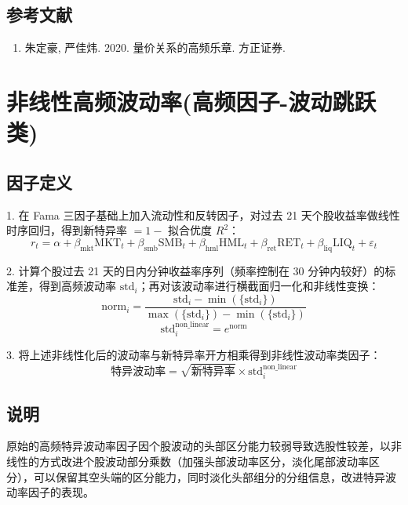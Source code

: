 \documentclass{article}
\begin{document}
\subsection{参考文献}
\begin{enumerate}
    \item 朱定豪, 严佳炜. 2020. 量价关系的高频乐章. 方正证券.
\end{enumerate}

\section{非线性高频波动率(高频因子-波动跳跃类)}

\subsection{因子定义}

1. 在 Fama 三因子基础上加入流动性和反转因子，对过去 21 天个股收益率做线性时序回归，得到新特异率 \( = 1 - \) 拟合优度 \( R^2 \)：
\begin{equation}
    r_t = \alpha + \beta_{\mathrm{mkt}} \mathrm{MKT}_t + \beta_{\mathrm{smb}} \mathrm{SMB}_t + \beta_{\mathrm{hml}} \mathrm{HML}_t + \beta_{\mathrm{ret}} \mathrm{RET}_t + \beta_{\mathrm{liq}} \mathrm{LIQ}_t + \varepsilon_t
\end{equation}

2. 计算个股过去 21 天的日内分钟收益率序列（频率控制在 30 分钟内较好）的标准差，得到高频波动率 \( \mathrm{std}_i \)；再对该波动率进行横截面归一化和非线性变换：
\begin{equation}
    \mathrm{norm}_i = \frac{\mathrm{std}_i - \min(\{\mathrm{std}_i\})}{\max(\{\mathrm{std}_i\}) - \min(\{\mathrm{std}_i\})}
\end{equation}
\begin{equation}
    \mathrm{std}_i^{\mathrm{non\_linear}} = e^{\mathrm{norm}}
\end{equation}

3. 将上述非线性化后的波动率与新特异率开方相乘得到非线性波动率类因子：
\begin{equation}
    \text{特异波动率} = \sqrt{\text{新特异率}} \times \mathrm{std}_i^{\mathrm{non\_linear}}
\end{equation}

\subsection{说明}
原始的高频特异波动率因子因个股波动的头部区分能力较弱导致选股性较差，以非线性的方式改进个股波动部分乘数（加强头部波动率区分，淡化尾部波动率区分），可以保留其空头端的区分能力，同时淡化头部组分的分组信息，改进特异波动率因子的表现。
\end{document}
